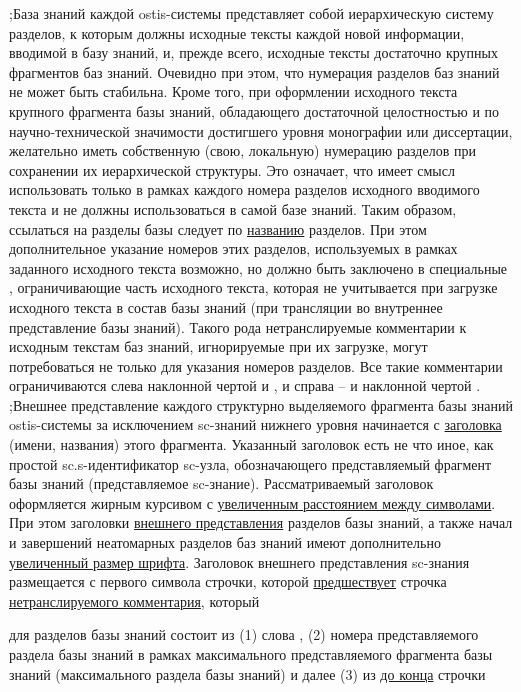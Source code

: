 \begin{SCn}
{;База знаний каждой ostis-системы представляет собой иерархическую систему разделов, к которым должны  исходные тексты каждой новой информации, вводимой в базу знаний, и, прежде всего, исходные тексты достаточно крупных фрагментов баз знаний.  Очевидно при этом, что нумерация разделов баз знаний не может быть стабильна. Кроме того, при оформлении исходного текста крупного фрагмента базы знаний, обладающего достаточной целостностью и по научно-технической значимости достигшего уровня монографии или диссертации, желательно иметь собственную (свою, локальную) нумерацию разделов при сохранении их иерархической структуры. Это означает, что имеет смысл использовать только в рамках каждого номера разделов исходного вводимого текста и не должны использоваться в самой базе знаний. Таким образом, ссылаться на разделы базы следует по \uline{названию} разделов. При этом дополнительное указание номеров этих разделов, используемых в рамках заданного исходного текста возможно, но должно быть заключено в специальные , ограничивающие часть исходного текста, которая не учитывается при загрузке исходного текста в состав базы знаний (при трансляции во внутреннее представление базы знаний). Такого рода нетранслируемые комментарии к исходным текстам баз знаний, игнорируемые при их загрузке, могут потребоваться не только для указания номеров разделов. Все такие комментарии ограничиваются слева наклонной чертой и  \scnqqi{/*}, и справа --   и наклонной чертой \scnqqi{*/}.
;Внешнее представление каждого структурно выделяемого фрагмента базы знаний ostis-системы за исключением sc-знаний нижнего уровня начинается с \uline{заголовка} (имени, названия) этого фрагмента. Указанный заголовок есть не что иное, как простой sc.s-идентификатор sc-узла, обозначающего представляемый фрагмент базы знаний (представляемое sc-знание). Рассматриваемый заголовок оформляется жирным курсивом с \uline{увеличенным расстоянием между символами}. При этом заголовки \uline{внешнего представления} разделов базы знаний, а также начал и завершений неатомарных разделов баз знаний имеют дополнительно \uline{увеличенный размер шрифта}. Заголовок внешнего представления sc-знания размещается с первого символа строчки, которой \uline{предшествует} строчка \uline{нетранслируемого комментария}, который 
\begin{scnitemize}
    \item для разделов базы знаний состоит из (1) слова , (2) номера представляемого раздела базы знаний в рамках максимального представляемого фрагмента базы знаний (максимального раздела базы знаний) и далее (3) из  \uline{до конца} строчки

\end{scnitemize}}
\end{SCn}
